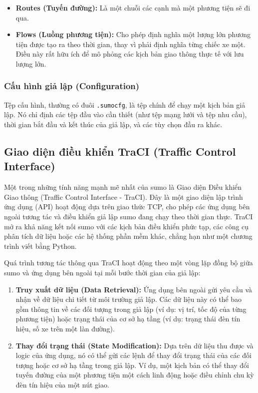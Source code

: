 \begin{enumerate}
\begin{itemize}
    \item \textbf{Routes (Tuyến đường):} Là một chuỗi các cạnh mà một phương
        tiện sẽ đi qua.

    \item \textbf{Flows (Luồng phương tiện):} Cho phép định nghĩa một lượng lớn
        phương tiện được tạo ra theo thời gian, thay vì phải định nghĩa từng chiếc
        xe một. Điều này rất hữu ích để mô phỏng các kịch bản giao thông thực tế
        với lưu lượng lớn.
\end{itemize}

\subsubsection{Cấu hình giả lập (Configuration)}
Tệp cấu hình, thường có đuôi \texttt{.sumocfg}, là tệp chính để chạy một kịch
bản giả lập. Nó chỉ định các tệp đầu vào cần thiết (như tệp mạng lưới và tệp nhu
cầu), thời gian bắt đầu và kết thúc của giả lập, và các tùy chọn đầu ra khác.

\subsection{Giao diện điều khiển TraCI (Traffic Control Interface)}
Một trong những tính năng mạnh mẽ nhất của \ac{sumo} là Giao diện Điều khiển
Giao thông (Traffic Control Interface - TraCI). Đây là một giao diện lập trình ứng
dụng (API) hoạt động dựa trên giao thức TCP, cho phép các ứng dụng bên ngoài
tương tác và điều khiển giả lập \ac{sumo} đang chạy theo thời gian thực. TraCI
mở ra khả năng kết nối \ac{sumo} với các kịch bản điều khiển phức tạp, các công
cụ phân tích dữ liệu hoặc các hệ thống phần mềm khác, chẳng hạn như một chương trình
viết bằng Python.

Quá trình tương tác thông qua TraCI hoạt động theo một vòng lặp đồng bộ giữa \ac{sumo}
và ứng dụng bên ngoài tại mỗi bước thời gian của giả lập:
\begin{enumerate}
    \item \textbf{Truy xuất dữ liệu (Data Retrieval):} Ứng dụng bên ngoài gửi
        yêu cầu và nhận về dữ liệu chi tiết từ môi trường giả lập. Các dữ liệu này
        có thể bao gồm thông tin về các đối tượng trong giả lập (ví dụ: vị trí,
        tốc độ của từng phương tiện) hoặc trạng thái của cơ sở hạ tầng (ví dụ: trạng
        thái đèn tín hiệu, số xe trên một làn đường).

    \item \textbf{Thay đổi trạng thái (State Modification):} Dựa trên dữ liệu
        thu được và logic của ứng dụng, nó có thể gửi các lệnh để thay đổi trạng
        thái của các đối tượng hoặc cơ sở hạ tầng trong giả lập. Ví dụ, một kịch
        bản có thể thay đổi tuyến đường của một phương tiện một cách linh động hoặc
        điều chỉnh chu kỳ đèn tín hiệu của một nút giao.


\end{enumerate}
\end{enumerate}

